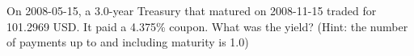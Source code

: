 On 2008-05-15, a 3.0-year Treasury that matured on 2008-11-15 traded for 101.2969 USD. It paid a 4.375\% coupon. What was the yield? (Hint: the number of payments up to and including maturity is 1.0)
